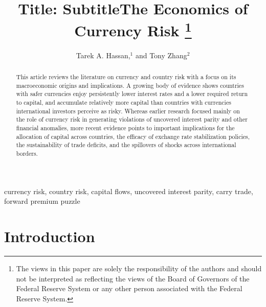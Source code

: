 \documentclass{ar-1col}
\begin{document}

\title{Title: Subtitle}


\author{Tarek A. Hassan,$^1$ and Tony Zhang$^2$  }



\title{The Economics of Currency Risk \thanks{The views in this paper are solely the responsibility of the authors and should not be interpreted as reflecting the views of the Board of Governors of the Federal Reserve System or any other person associated with the Federal Reserve System.}}



\begin{abstract}
  This article reviews the literature on currency and country risk with a focus on its macroeconomic origins and implications. A growing body of evidence shows countries with safer currencies enjoy persistently lower interest rates and a lower required return to capital, and accumulate relatively more capital than countries with currencies international investors perceive as risky. Whereas earlier research focused mainly on the role of currency risk in generating violations of uncovered interest parity and other financial anomalies, more recent evidence points to important implications for the allocation of capital across countries, the efficacy of exchange rate stabilization policies, the sustainability of trade deficits, and the spillovers of shocks across international borders.
\end{abstract}


\begin{keywords}
  currency risk, country risk, capital flows, uncovered interest parity, carry trade, forward premium puzzle
\end{keywords}
\maketitle


\section{Introduction}
\end{document}
